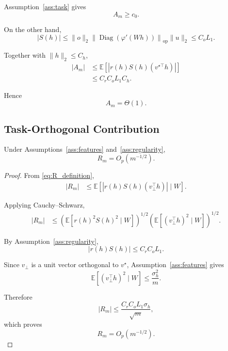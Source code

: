 Assumption~\ref{ass:task} gives
\begin{equation}
A_m\geq c_0.
\end{equation}

On the other hand,
\begin{equation}
|S(h)|
\leq
\|o\|_2
\left\|
\operatorname{Diag}(\varphi'(Wh))
\right\|_{\mathrm{op}}
\|u\|_2
\leq
C_oL_1.
\end{equation}

Together with $\|h\|_2\leq C_h$,
\begin{align}
|A_m|
&\leq
\mathbb{E}
\left[
|r(h)S(h)(v^{\star\top}h)|
\right]
\\
&\leq
C_rC_oL_1C_h.
\end{align}

Hence
\begin{equation}
A_m=\Theta(1).
\label{eq:A_order}
\end{equation}


\subsection{Task-Orthogonal Contribution}

\begin{lemma}
\label{lem:R_order}
Under Assumptions~\ref{ass:features} and~\ref{ass:regularity},
\begin{equation}
R_m
=
O_p(m^{-1/2}).
\end{equation}
\end{lemma}

\begin{proof}
From \eqref{eq:R_definition},
\begin{align}
|R_m|
&\leq
\mathbb{E}
\left[
|r(h)S(h)(v_\perp^\top h)|
\mid W
\right].
\end{align}

Applying Cauchy--Schwarz,
\begin{align}
|R_m|
&\leq
\left(
\mathbb{E}
[
r(h)^2S(h)^2
\mid W
]
\right)^{1/2}
\left(
\mathbb{E}
[
(v_\perp^\top h)^2
\mid W
]
\right)^{1/2}.
\end{align}

By Assumption~\ref{ass:regularity},
\begin{equation}
|r(h)S(h)|
\leq
C_rC_oL_1.
\end{equation}

Since $v_\perp$ is a unit vector orthogonal to $v^\star$,
Assumption~\ref{ass:features} gives
\begin{equation}
\mathbb{E}
[
(v_\perp^\top h)^2
\mid W
]
\leq
\frac{\sigma_h^2}{m}.
\end{equation}

Therefore
\begin{equation}
|R_m|
\leq
\frac{C_rC_oL_1\sigma_h}{\sqrt m},
\end{equation}
which proves
\begin{equation}
R_m
=
O_p(m^{-1/2}).
\end{equation}
\end{proof}



